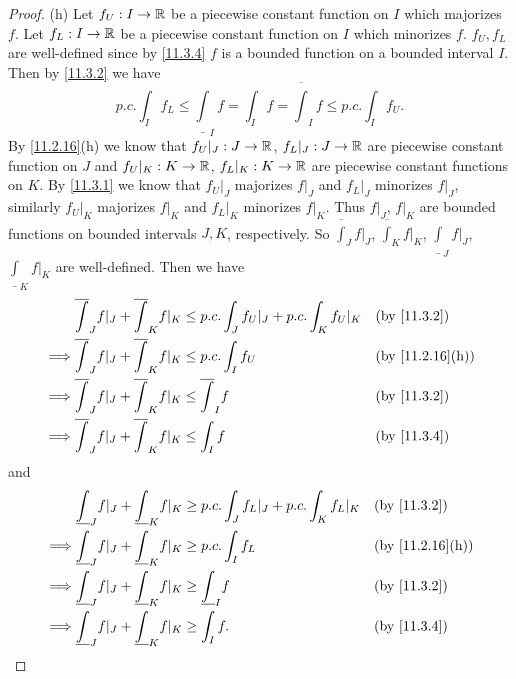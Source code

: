 \begin{proof}{(h)}
  Let \(f_U : I \to \mathbb{R}\) be a piecewise constant function on \(I\) which majorizes \(f\).
  Let \(f_L : I \to \mathbb{R}\) be a piecewise constant function on \(I\) which minorizes \(f\).
  \(f_U, f_L\) are well-defined since by \cref{11.3.4} \(f\) is a bounded function on a bounded interval \(I\).
  Then by \cref{11.3.2} we have
  \[
    p.c. \int_I f_L \leq \underline{\int}_I f = \int_I f = \overline{\int}_I f \leq p.c. \int_I f_U.
  \]
  By \cref{11.2.16}(h) we know that \(f_U|_J : J \to \mathbb{R}\), \(f_L|_J : J \to \mathbb{R}\) are piecewise constant function on \(J\) and \(f_U|_K : K \to \mathbb{R}\), \(f_L|_K : K \to \mathbb{R}\) are piecewise constant functions on \(K\).
  By \cref{11.3.1} we know that \(f_U|_J\) majorizes \(f|_J\) and \(f_L|_J\) minorizes \(f|_J\), similarly \(f_U|_K\) majorizes \(f|_K\) and \(f_L|_K\) minorizes \(f|_K\).
  Thus \(f|_J\), \(f|_K\) are bounded functions on bounded intervals \(J, K\), respectively.
  So \(\overline{\int}_J f|_J\), \(\overline{\int}_K f|_K\), \(\underline{\int}_J f|_J\), \(\underline{\int}_K f|_K\) are well-defined.
  Then we have
  \begin{align*}
             & \overline{\int}_J f|_J + \overline{\int}_K f|_K \leq p.c. \int_J f_U|_J + p.c. \int_K f_U|_K &  & \by{11.3.2}                   \\
    \implies & \overline{\int}_J f|_J + \overline{\int}_K f|_K \leq p.c. \int_I f_U                         &  & \text{(by \cref{11.2.16}(h))} \\
    \implies & \overline{\int}_J f|_J + \overline{\int}_K f|_K \leq \overline{\int}_I f                     &  & \by{11.3.2}                   \\
    \implies & \overline{\int}_J f|_J + \overline{\int}_K f|_K \leq \int_I f                                &  & \by{11.3.4}
  \end{align*}
  and
  \begin{align*}
             & \underline{\int}_J f|_J + \underline{\int}_K f|_K \geq p.c. \int_J f_L|_J + p.c. \int_K f_L|_K &  & \by{11.3.2}                   \\
    \implies & \underline{\int}_J f|_J + \underline{\int}_K f|_K \geq p.c. \int_I f_L                         &  & \text{(by \cref{11.2.16}(h))} \\
    \implies & \underline{\int}_J f|_J + \underline{\int}_K f|_K \geq \underline{\int}_I f                    &  & \by{11.3.2}                   \\
    \implies & \underline{\int}_J f|_J + \underline{\int}_K f|_K \geq \int_I f.                               &  & \by{11.3.4}

\end{align*}
\end{proof}
